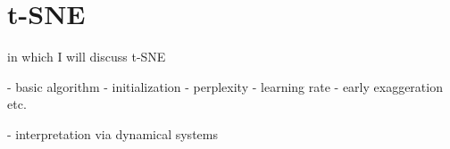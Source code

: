 \chapter{t-SNE}\label{chapter:t-sne}

in which I will discuss t-SNE

- basic algorithm 
- initialization 
- perplexity 
- learning rate 
- early exaggeration 
etc. 

- interpretation via dynamical systems




